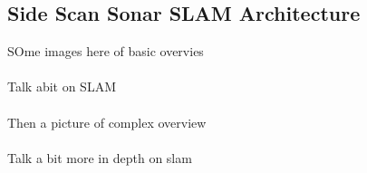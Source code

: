 \subsection{Side Scan Sonar SLAM Architecture}
SOme images here of basic overvies
\\ \\
Talk abit on SLAM
\\ \\
Then a picture of complex overview
\\ \\
Talk a bit more in depth on slam